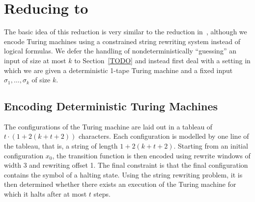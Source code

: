 \documentclass[a4paper,UKenglish,cleveref, autoref]{lipics-v2019}
\begin{document}
\section{Reducing \gennp{} to \strconrew{}}
The basic idea of this reduction is very similar to the reduction in~\cite{Sipser:TheoryofComputation}, although we encode Turing machines using a constrained string rewriting system instead of logical formulas. We defer the handling of nondeterministically ``guessing'' an input of size at most $k$ to Section~\ref{TODO} and instead first deal with a setting in which we are given a deterministic 1-tape Turing machine and a fixed input $\sigma_1, \ldots, \sigma_k$ of size $k$. 

\subsection{Encoding Deterministic Turing Machines}
The configurations of the Turing machine are laid out in a tableau of $t \cdot (1 + 2(k + t + 2))$ characters. Each configuration is modelled by one line of the tableau, that is, a string of length $1 + 2(k + t + 2)$. Starting from an initial configuration $x_0$, the transition function is then encoded using rewrite windows of width 3 and rewriting offset 1. The final constraint is that the final configuration contains the symbol of a halting state. 
Using the string rewriting problem, it is then determined whether there exists an execution of the Turing machine for which it halts after at most $t$ steps. 
\end{document}
